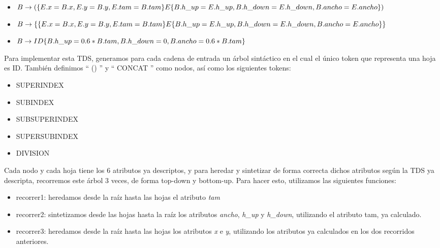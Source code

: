 \documentclass[a4paper, 10pt, twoside]{article}
\begin{document}
\begin{itemize}
  \item $ B \rightarrow ( \{ E.x = B.x, E.y = B.y, E.tam = B.tam \} E \\
                          \{ B.h\_up = E.h\_up, B.h\_down = E.h\_down, B.ancho = E.ancho \} ) \\ $

  \item $ B \rightarrow \{ \{ E.x = B.x, E.y = B.y, E.tam = B.tam \} E \\
                          \{ B.h\_up = E.h\_up, B.h\_down = E.h\_down, B.ancho = E.ancho \} \} \\ $

  \item $ B \rightarrow ID \{ B.h\_up = 0.6 * B.tam, B.h\_down = 0, B.ancho = 0.6 * B.tam \} \\ $  

\end{itemize}

Para implementar esta TDS, generamos para cada cadena de entrada un árbol sintáctico en el cual el único token que representa una hoja es ID. También definimos `` () '' y `` CONCAT '' como nodos, así como los siguientes tokens:
\begin{itemize} 
  \item SUPERINDEX
  \item SUBINDEX
  \item SUBSUPERINDEX
  \item SUPERSUBINDEX
  \item DIVISION
\end{itemize}

Cada nodo y cada hoja tiene los 6 atributos ya descriptos, y para heredar y sintetizar de forma correcta dichos atributos según la TDS ya descripta, recorremos este árbol 3 veces, de forma top-down y bottom-up. Para hacer esto, utilizamos las siguientes funciones:
\begin{itemize}
  \item recorrer1: heredamos desde la raíz hasta las hojas el atributo \emph{tam} 
  \item recorrer2: sintetizamos desde las hojas hasta la raíz los atributos \emph{ancho}, \emph{h\_up} y \emph{h\_down}, utilizando el atributo tam, ya calculado.
  \item recorrer3: heredamos desde la raíz hasta las hojas los atributos \emph{x} e \emph{y}, utilizando los atributos ya calculados en los dos recorridos anteriores.
\end{itemize}
\end{document}
